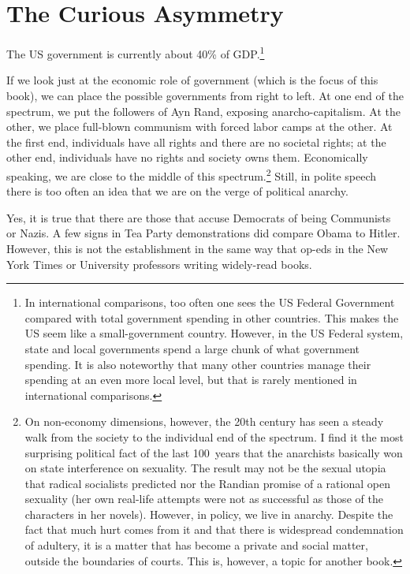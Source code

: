 \chapter{The Curious Asymmetry}

The US government is currently about 40\% of GDP.\footnote{In international
comparisons, too often one sees the US Federal Government compared with total
government spending in other countries. This makes the US seem like a
small-government country. However, in the US Federal system, state and local
governments spend a large chunk of what government spending. It is also
noteworthy that many other countries manage their spending at an even more
local level, but that is rarely mentioned in international comparisons.}

If we look just at the economic role of government (which is the focus of this
book), we can place the possible governments from right to left. At one end of
the spectrum, we put the followers of Ayn Rand, exposing anarcho-capitalism. At
the other, we place  full-blown communism with forced labor camps at the other.
At the first end, individuals have all rights and there are no societal rights;
at the other end, individuals have no rights and society owns them.
Economically speaking, we are close to the middle of this spectrum.\footnote{On
non-economy dimensions, however, the 20th century has seen a steady walk from
the society to the individual end of the spectrum. I find it the most
surprising political fact of the last 100~years that the anarchists basically
won on state interference on sexuality. The result may not be the sexual utopia
that radical socialists predicted nor the Randian promise of a rational open
sexuality (her own real-life attempts were not as successful as those of the
characters in her novels). However, in policy, we live in anarchy. Despite the
fact that much hurt comes from it and that there is widespread condemnation of
adultery, it is a matter that has become a private and social matter, outside
the boundaries of courts.  This is, however, a topic for another book.} Still,
in polite speech there is too often an idea that we are on the verge of
political anarchy.

Yes, it is true that there are those that accuse Democrats of being Communists
or Nazis. A few signs in Tea Party demonstrations did compare Obama to Hitler.
However, this is not the establishment in the same way that op-eds in the New
York Times or University professors writing widely-read books.

